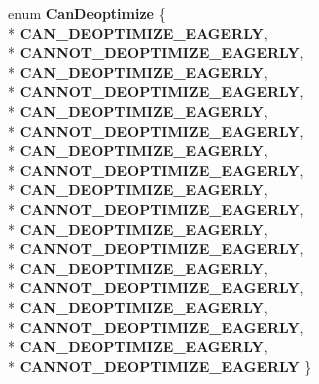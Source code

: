 \begin{DoxyCompactItemize}
\item 
enum {\bfseries Can\+Deoptimize} \{ \\*
{\bfseries C\+A\+N\+\_\+\+D\+E\+O\+P\+T\+I\+M\+I\+Z\+E\+\_\+\+E\+A\+G\+E\+R\+LY}, 
\\*
{\bfseries C\+A\+N\+N\+O\+T\+\_\+\+D\+E\+O\+P\+T\+I\+M\+I\+Z\+E\+\_\+\+E\+A\+G\+E\+R\+LY}, 
\\*
{\bfseries C\+A\+N\+\_\+\+D\+E\+O\+P\+T\+I\+M\+I\+Z\+E\+\_\+\+E\+A\+G\+E\+R\+LY}, 
\\*
{\bfseries C\+A\+N\+N\+O\+T\+\_\+\+D\+E\+O\+P\+T\+I\+M\+I\+Z\+E\+\_\+\+E\+A\+G\+E\+R\+LY}, 
\\*
{\bfseries C\+A\+N\+\_\+\+D\+E\+O\+P\+T\+I\+M\+I\+Z\+E\+\_\+\+E\+A\+G\+E\+R\+LY}, 
\\*
{\bfseries C\+A\+N\+N\+O\+T\+\_\+\+D\+E\+O\+P\+T\+I\+M\+I\+Z\+E\+\_\+\+E\+A\+G\+E\+R\+LY}, 
\\*
{\bfseries C\+A\+N\+\_\+\+D\+E\+O\+P\+T\+I\+M\+I\+Z\+E\+\_\+\+E\+A\+G\+E\+R\+LY}, 
\\*
{\bfseries C\+A\+N\+N\+O\+T\+\_\+\+D\+E\+O\+P\+T\+I\+M\+I\+Z\+E\+\_\+\+E\+A\+G\+E\+R\+LY}, 
\\*
{\bfseries C\+A\+N\+\_\+\+D\+E\+O\+P\+T\+I\+M\+I\+Z\+E\+\_\+\+E\+A\+G\+E\+R\+LY}, 
\\*
{\bfseries C\+A\+N\+N\+O\+T\+\_\+\+D\+E\+O\+P\+T\+I\+M\+I\+Z\+E\+\_\+\+E\+A\+G\+E\+R\+LY}, 
\\*
{\bfseries C\+A\+N\+\_\+\+D\+E\+O\+P\+T\+I\+M\+I\+Z\+E\+\_\+\+E\+A\+G\+E\+R\+LY}, 
\\*
{\bfseries C\+A\+N\+N\+O\+T\+\_\+\+D\+E\+O\+P\+T\+I\+M\+I\+Z\+E\+\_\+\+E\+A\+G\+E\+R\+LY}, 
\\*
{\bfseries C\+A\+N\+\_\+\+D\+E\+O\+P\+T\+I\+M\+I\+Z\+E\+\_\+\+E\+A\+G\+E\+R\+LY}, 
\\*
{\bfseries C\+A\+N\+N\+O\+T\+\_\+\+D\+E\+O\+P\+T\+I\+M\+I\+Z\+E\+\_\+\+E\+A\+G\+E\+R\+LY}, 
\\*
{\bfseries C\+A\+N\+\_\+\+D\+E\+O\+P\+T\+I\+M\+I\+Z\+E\+\_\+\+E\+A\+G\+E\+R\+LY}, 
\\*
{\bfseries C\+A\+N\+N\+O\+T\+\_\+\+D\+E\+O\+P\+T\+I\+M\+I\+Z\+E\+\_\+\+E\+A\+G\+E\+R\+LY}, 
\\*
{\bfseries C\+A\+N\+\_\+\+D\+E\+O\+P\+T\+I\+M\+I\+Z\+E\+\_\+\+E\+A\+G\+E\+R\+LY}, 
\\*
{\bfseries C\+A\+N\+N\+O\+T\+\_\+\+D\+E\+O\+P\+T\+I\+M\+I\+Z\+E\+\_\+\+E\+A\+G\+E\+R\+LY}
 \}\hypertarget{classv8_1_1internal_1_1_l_chunk_builder_a9cad53584f2d1fbb8c273561a6e3f2e9}{}\label{classv8_1_1internal_1_1_l_chunk_builder_a9cad53584f2d1fbb8c273561a6e3f2e9}


\end{DoxyCompactItemize}
